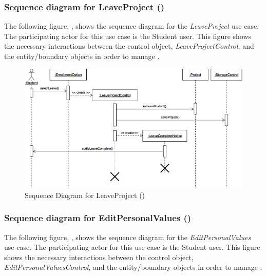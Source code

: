 \documentclass[12pt,letterpaper]{article}
\begin{document}
\subsubsection*{Sequence diagram for LeaveProject ()}

The following figure, , shows the sequence diagram for the {\it LeaveProject} use case. The participating actor for this use case is
the Student user. This figure shows the necessary interactions between the control object, {\it LeaveProjectControl}, and the
entity/boundary objects in order to manage .

\begin{figure}[H]
	\centering{}
	\includegraphics[scale=0.25]{imgs/seq/leave-project.png}
	\caption[ - Sequence Diagram for LeaveProject]{Sequence Diagram for LeaveProject ()}
\end{figure}

\subsubsection*{Sequence diagram for EditPersonalValues ()}

The following figure, , shows the sequence diagram for the {\it EditPersonalValues} use case. The participating actor for this use case is
the Student user. This figure shows the necessary interactions between the control object, {\it EditPersonalValuesControl}, and the
entity/boundary objects in order to manage .
\end{document}
